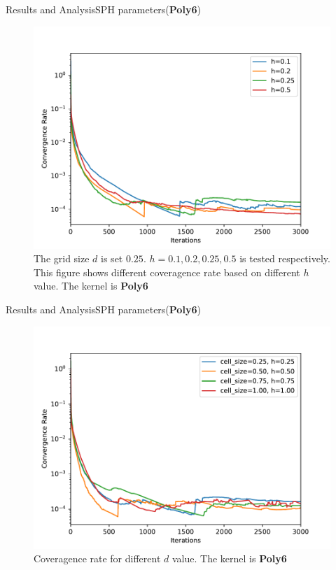 \documentclass{beamer}
\begin{document}
\begin{frame}{Results and Analysis}{SPH parameters(\textbf{Poly6})}
\begin{figure}[!ht]
    \centering
    \includegraphics[scale=0.4]{../report/Figures/size25.pdf}
    \caption{The grid size $d$ is set $0.25$. $h=0.1, 0.2, 0.25, 0.5$ is tested respectively. This figure shows different coveragence rate based on different $h$ value. The kernel is \textbf{Poly6}}
\end{figure}
\end{frame}
\begin{frame}{Results and Analysis}{SPH parameters(\textbf{Poly6})}
\begin{figure}[!ht]
    \centering
    \includegraphics[scale=0.4]{../report/Figures/hd.pdf}
    \caption{Coveragence rate for different $d$ value. The kernel is \textbf{Poly6}}
\end{figure}
\end{frame}
\end{document}
